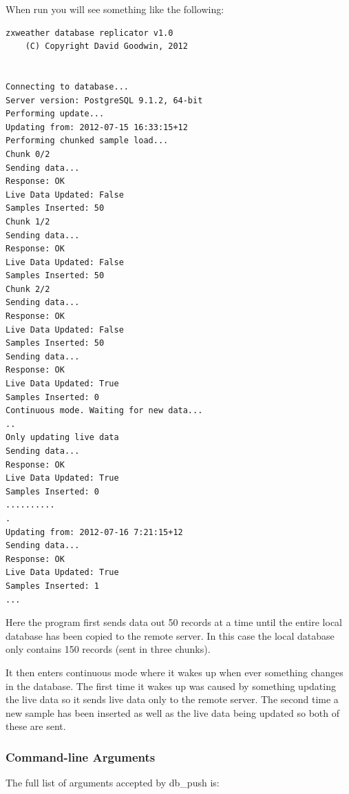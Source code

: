 \documentclass[a4paper,10pt,draft]{book}
\begin{document}
When run you will see something like the following:
\begin{verbatim}
zxweather database replicator v1.0
	(C) Copyright David Goodwin, 2012


Connecting to database...
Server version: PostgreSQL 9.1.2, 64-bit
Performing update...
Updating from: 2012-07-15 16:33:15+12
Performing chunked sample load...
Chunk 0/2
Sending data...
Response: OK
Live Data Updated: False
Samples Inserted: 50
Chunk 1/2
Sending data...
Response: OK
Live Data Updated: False
Samples Inserted: 50
Chunk 2/2
Sending data...
Response: OK
Live Data Updated: False
Samples Inserted: 50
Sending data...
Response: OK
Live Data Updated: True
Samples Inserted: 0
Continuous mode. Waiting for new data...
..
Only updating live data
Sending data...
Response: OK
Live Data Updated: True
Samples Inserted: 0
..........
.
Updating from: 2012-07-16 7:21:15+12
Sending data...
Response: OK
Live Data Updated: True
Samples Inserted: 1
...
\end{verbatim}

Here the program first sends data out 50 records at a time until the entire local database has been copied to the remote server. In this case the local database only contains 150 records (sent in three chunks).

It then enters continuous mode where it wakes up when ever something changes in the database. The first time it wakes up was caused by something updating the live data so it sends live data only to the remote server. The second time a new sample has been inserted as well as the live data being updated so both of these are sent.

\subsubsection{Command-line Arguments}
The full list of arguments accepted by db\_push is:
\end{document}

